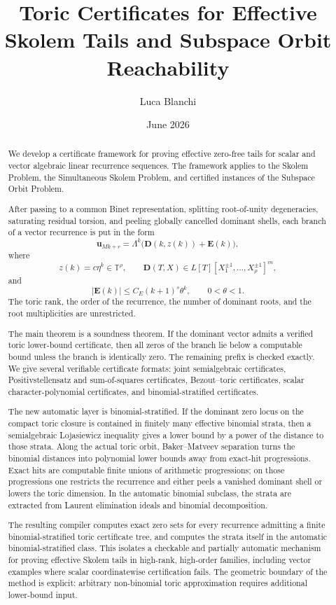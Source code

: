 \documentclass[11pt]{article}
\title{Toric Certificates for Effective Skolem Tails and Subspace Orbit Reachability}
\author{Luca Blanchi}
\date{June 2026}
\newcommand{\T}{\mathbb T}
\begin{document}
\maketitle

\begin{abstract}
We develop a certificate framework for proving effective zero-free tails for scalar and vector algebraic linear recurrence sequences. The framework applies to the Skolem Problem, the Simultaneous Skolem Problem, and certified instances of the Subspace Orbit Problem.

After passing to a common Binet representation, splitting root-of-unity degeneracies, saturating residual torsion, and peeling globally cancelled dominant shells, each branch of a vector recurrence is put in the form
\[
\mathbf u_{Mk+r}
=
\Lambda^k\bigl(\mathbf D(k,z(k))+\mathbf E(k)\bigr),
\]
where
\[
z(k)=c\eta^k\in \T^\rho,
\qquad
\mathbf D(T,X)\in L[T][X_1^{\pm1},\ldots,X_\rho^{\pm1}]^m,
\]
and
\[
|\mathbf E(k)|\le C_E(k+1)^s\theta^k,
\qquad
0<\theta<1.
\]
The toric rank, the order of the recurrence, the number of dominant roots, and the root multiplicities are unrestricted.

The main theorem is a soundness theorem. If the dominant vector admits a verified toric lower-bound certificate, then all zeros of the branch lie below a computable bound unless the branch is identically zero. The remaining prefix is checked exactly. We give several verifiable certificate formats: joint semialgebraic certificates, Positivstellensatz and sum-of-squares certificates, Bezout--toric certificates, scalar character-polynomial certificates, and binomial-stratified certificates.

The new automatic layer is binomial-stratified. If the dominant zero locus on the compact toric closure is contained in finitely many effective binomial strata, then a semialgebraic Lojasiewicz inequality gives a lower bound by a power of the distance to those strata. Along the actual toric orbit, Baker--Matveev separation turns the binomial distances into polynomial lower bounds away from exact-hit progressions. Exact hits are computable finite unions of arithmetic progressions; on those progressions one restricts the recurrence and either peels a vanished dominant shell or lowers the toric dimension. In the automatic binomial subclass, the strata are extracted from Laurent elimination ideals and binomial decomposition.

The resulting compiler computes exact zero sets for every recurrence admitting a finite binomial-stratified toric certificate tree, and computes the strata itself in the automatic binomial-stratified class. This isolates a checkable and partially automatic mechanism for proving effective Skolem tails in high-rank, high-order families, including vector examples where scalar coordinatewise certification fails. The geometric boundary of the method is explicit: arbitrary non-binomial toric approximation requires additional lower-bound input.
\end{abstract}
\end{document}
